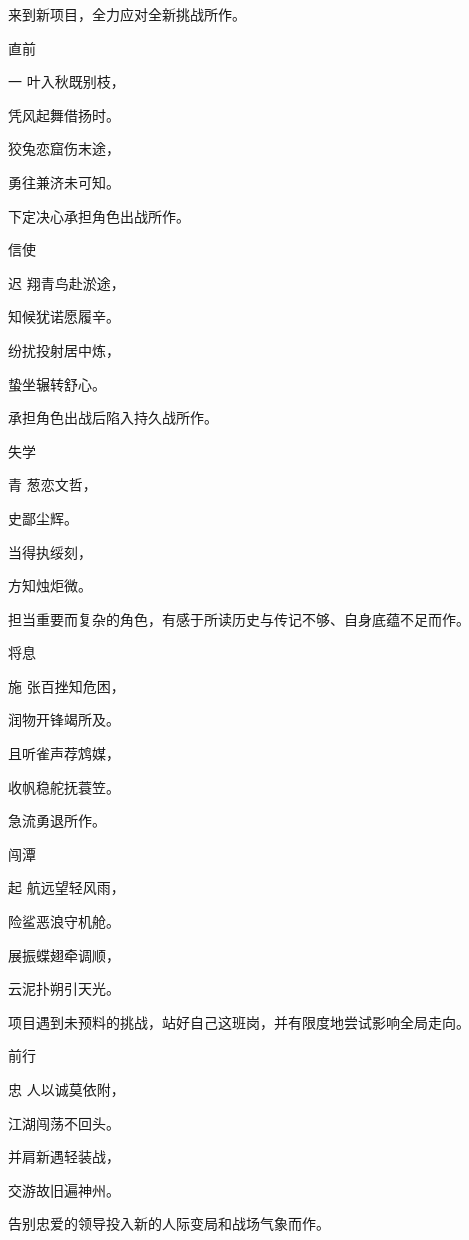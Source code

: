 \documentclass{article}
\newenvironment{poem}[3]{
\begin{minipage}{\textwidth}
\begin{pinyinscope}\begin{center}\Large\linespread{1.4}\selectfont #2\end{center}\end{pinyinscope}
\begin{pinyinscope}
	\begin{center}
	\Large\linespread{1.4}\rmfamily\selectfont #3
}{\end{center}
\end{pinyinscope}
\end{minipage}
}
\begin{document}
来到新项目，全力应对全新挑战所作。

\begin{poem}{}{直前}
一叶入秋既别枝，

凭风起舞借扬时。

狡兔恋窟伤末途，

勇往兼济未可知。
\end{poem}

下定决心承担角色出战所作。

\begin{poem}{}{信使}
迟翔青鸟赴淤途，

知候犹诺愿履辛。

纷扰投射居中炼，

蛰坐辗转舒{}心。
\end{poem}

承担角色出战后陷入持久战所作。

\begin{poem}{}{失学}
青葱恋文哲，

史{}鄙尘辉。

当得执绥刻，

方知烛炬微。
\end{poem}

担当重要而复杂的角色，有感于所读历史与传记不够、自身底蕴不足而作。

\begin{poem}{}{将息}
施张百挫知危困，

润物开锋竭所及。

且听雀声荐鸩媒，

收帆稳舵抚蓑笠。
\end{poem}

急流勇退所作。

\begin{poem}{}{闯潭}
起航远望轻风雨，

险鲨恶浪守机舱。

展振蝶翅牵调顺，

云泥扑朔引天光。
\end{poem}

项目遇到未预料的挑战，站好自己这班岗，并有限度地尝试影响全局走向。

\begin{poem}{}{前行}
忠人以诚莫依附，

江湖闯荡不回头。

并肩新遇轻装战，

交游故旧遍神州。
\end{poem}

告别忠爱的领导投入新的人际变局和战场气象而作。
\end{document}

